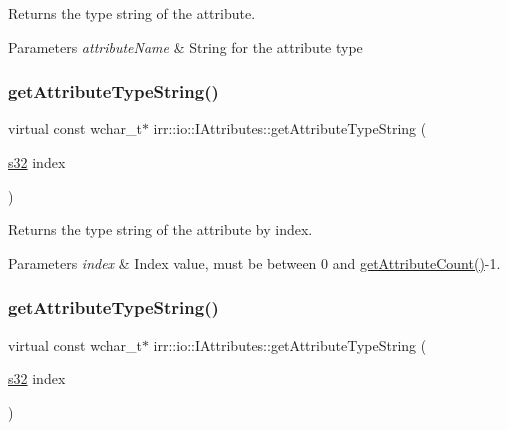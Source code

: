 Returns the type string of the attribute. 


\begin{DoxyParams}{Parameters}
{\em attribute\+Name} & String for the attribute type \\
\hline
\end{DoxyParams}
\mbox{\label{classirr_1_1io_1_1IAttributes_a2dc2dffe38bc50222615f40a7ca7711a}} 
\subsubsection{\texorpdfstring{get\+Attribute\+Type\+String()}{getAttributeTypeString()}\hspace{0.1cm}{\footnotesize\ttfamily [3/4]}}
{\footnotesize\ttfamily virtual const wchar\+\_\+t$\ast$ irr\+::io\+::\+I\+Attributes\+::get\+Attribute\+Type\+String (\begin{DoxyParamCaption}\item[{\hyperlink{namespaceirr_ac66849b7a6ed16e30ebede579f9b47c6}{s32}}]{index }\end{DoxyParamCaption})\hspace{0.3cm}{\ttfamily [pure virtual]}}



Returns the type string of the attribute by index. 


\begin{DoxyParams}{Parameters}
{\em index} & Index value, must be between 0 and \hyperlink{classirr_1_1io_1_1IAttributes_a796bdd9440ee7ba0b6742a90a82870b6}{get\+Attribute\+Count()}-\/1. \\
\hline
\end{DoxyParams}
\mbox{\label{classirr_1_1io_1_1IAttributes_a2dc2dffe38bc50222615f40a7ca7711a}} 
\subsubsection{\texorpdfstring{get\+Attribute\+Type\+String()}{getAttributeTypeString()}\hspace{0.1cm}{\footnotesize\ttfamily [4/4]}}
{\footnotesize\ttfamily virtual const wchar\+\_\+t$\ast$ irr\+::io\+::\+I\+Attributes\+::get\+Attribute\+Type\+String (\begin{DoxyParamCaption}\item[{\hyperlink{namespaceirr_ac66849b7a6ed16e30ebede579f9b47c6}{s32}}]{index }\end{DoxyParamCaption})\hspace{0.3cm}{\ttfamily [pure virtual]}}



